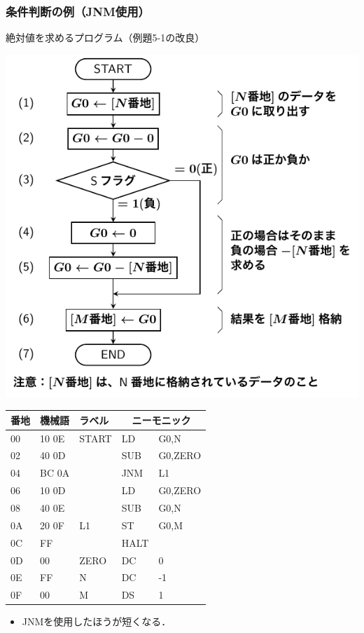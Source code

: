 \documentclass[handout]{beamer}        %
\begin{document}
\begin{frame}
  \frametitle{条件判断の例（JNM使用）}
  絶対値を求めるプログラム（例題5-1の改良）\\
  \vfill
  \begin{minipage}{0.49\columnwidth}
    \centerline{\includegraphics[scale=0.5]{../Tikz/flow1.pdf}}
  \end{minipage}
  \begin{minipage}{0.5\columnwidth}
    {\ttfamily\scriptsize\begin{center}
      \begin{tabular}{|l|l|l|l l|}
        \hline
        番地 & 機械語 & ラベル & \multicolumn{2}{|c|}{ニーモニック} \\
        \hline
        00 & 10 0E & START& LD   & G0,N    \\
        02 & 40 0D &      & SUB  & G0,ZERO \\
        04 & BC 0A &      & JNM  & L1      \\
        06 & 10 0D &      & LD   & G0,ZERO \\
        08 & 40 0E &      & SUB  & G0,N    \\
        0A & 20 0F & L1   & ST   & G0,M    \\
        0C & FF    &      & HALT &         \\
        0D & 00    & ZERO & DC   & 0       \\
        0E & FF    & N    & DC   & -1      \\
        0F & 00    & M    & DS   & 1       \\
        \hline
      \end{tabular}
    \end{center}}
  \end{minipage}
  \vfill
  \begin{itemize}
  \item JNMを使用したほうが短くなる．
  \end{itemize}
\end{frame}
\end{document}
